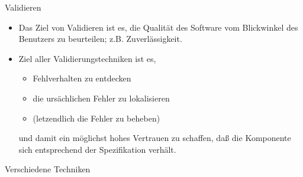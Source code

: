 \centerline{Validieren}

\bigskip

\begin{itemize}

\item Das Ziel von Validieren ist es, die Qualit\"at des Software vom
Blickwinkel des Benutzers zu beurteilen; z.B. Zuverl\"assigkeit.

\item Ziel aller Validierungstechniken ist es,

\begin{itemize}
\item Fehlverhalten zu entdecken
\item die urs\"achlichen Fehler zu lokalisieren
\item (letzendlich die Fehler zu beheben)
\end{itemize}

und damit ein m\"oglichst hohes Vertrauen zu schaffen, da{\ss} die
Komponente sich entsprechend der Spezifikation verh\"alt.

\end{itemize}



\newpage
\centerline{Verschiedene Techniken}
\bigskip


